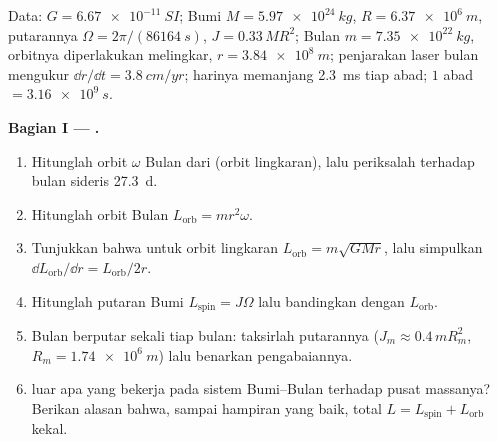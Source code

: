 \begin{problem}
\label{pb:b1:angular-momentum:1}
Data: $G = \qty{6.67e-11}{SI}$; Bumi $M = \qty{5.97e24}{kg}$, $R =
\qty{6.37e6}{m}$, putarannya $\Omega = 2\pi/(\qty{86164}{s})$,  $J = 0.33\,MR^2$; Bulan $m = \qty{7.35e22}{kg}$, orbitnya
diperlakukan melingkar, $r = \qty{3.84e8}{m}$; penjarakan laser bulan
mengukur $\dd r/\dd t = \qty{3.8}{cm/yr}$; harinya memanjang
\qty{2.3}{ms} tiap abad; $1$ abad $= \qty{3.16e9}{s}$.

\medskip
\noindent\textbf{Bagian I --- .}
\begin{enumerate}
  \item Hitunglah  orbit $\omega$ Bulan dari 
        (orbit lingkaran), lalu periksalah terhadap bulan sideris
        \qty{27.3}{d}.
  \item Hitunglah  orbit Bulan $L_{\text{orb}} =
        mr^2\omega$.
  \item Tunjukkan bahwa untuk orbit lingkaran $L_{\text{orb}} = m\sqrt{GMr}$,
        lalu simpulkan $\dd L_{\text{orb}}/\dd r = L_{\text{orb}}/2r$.
  \item Hitunglah  putaran Bumi $L_{\text{spin}} =
        J\Omega$ lalu bandingkan dengan $L_{\text{orb}}$.
  \item Bulan berputar sekali tiap bulan: taksirlah 
        putarannya ($J_m \approx 0.4\,mR_m^2$, $R_m = \qty{1.74e6}{m}$)
        lalu benarkan pengabaiannya.
  \item {} luar apa yang bekerja pada sistem Bumi--Bulan terhadap
        pusat massanya? Berikan alasan bahwa, sampai hampiran yang baik,
        total $L = L_{\text{spin}} + L_{\text{orb}}$ kekal.
\end{enumerate}


\end{problem}
